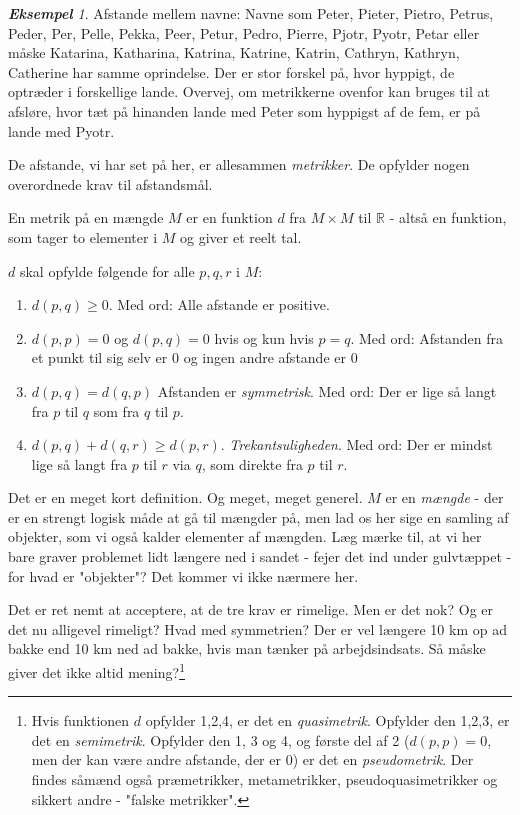 \documentclass[a4paper, 12pt]{article}
\theoremstyle{remark}
\newtheorem{Eksempel}{\textbf{Eksempel}}
\begin{document}
\begin{Eksempel}
Afstande mellem navne: Navne som Peter, Pieter, Pietro, Petrus, Peder, Per, Pelle, Pekka, Peer, Petur, Pedro, Pierre, Pjotr, Pyotr, Petar eller måske Katarina, Katharina, Katrina, Katrine, Katrin, Cathryn, Kathryn, Catherine har samme oprindelse. Der er stor forskel på, hvor hyppigt, de optræder i forskellige lande. Overvej, om metrikkerne ovenfor kan bruges til at afsløre, hvor tæt på hinanden lande med Peter som hyppigst af de fem, er på lande med Pyotr. 


\end{Eksempel}
De afstande, vi har set på her, er allesammen \emph{metrikker}. De opfylder nogen overordnede krav til afstandsmål. 
\begin{tcolorbox}[title=Metrik]
En metrik på en mængde $M$ er en funktion $d$ fra $M\times M$  til $\mathbb{R}$ - altså en funktion, som tager to elementer  i $M$ og giver et reelt tal.

$d$ skal opfylde følgende for alle $p,q,r$ i $M$:
\begin{enumerate}
\item $d(p,q)\geq 0$. Med ord: Alle afstande er positive.
\item $d(p,p)=0$ og $d(p,q)=0$ hvis og kun hvis $p=q$.  Med ord: Afstanden fra et punkt til sig selv er $0$ og ingen andre afstande er $0$
\item $d(p,q)=d(q,p)$ Afstanden er \emph{symmetrisk}. Med ord: Der er lige så langt fra $p$ til $q$ som fra $q$ til $p$.
\item $d(p,q)+d(q,r)\geq d(p,r)$. \emph{Trekantsuligheden}. Med ord:  Der er mindst lige så langt fra $p$ til $ r$ via $q$, som direkte fra $p$ til $r$. 
\end{enumerate}
\end{tcolorbox}

Det er en meget kort definition. Og meget, meget generel. $M$ er en \emph{mængde} - der er en strengt logisk måde at gå til mængder på, men lad os her sige en samling af objekter, som vi også kalder elementer af mængden. Læg mærke til, at vi her bare graver problemet lidt længere ned i sandet - fejer det ind under gulvtæppet - for hvad er "objekter"?  Det kommer vi ikke nærmere her. 

Det er ret nemt at acceptere, at de tre krav er rimelige. Men er det nok? Og er det nu alligevel rimeligt? Hvad med symmetrien? Der er vel længere 10 km op ad bakke end 10 km ned ad bakke, hvis man tænker på arbejdsindsats. Så måske giver det ikke altid mening?\footnote{ Hvis funktionen $d$ opfylder 1,2,4, er det en \emph{quasimetrik}. Opfylder den 1,2,3, er det en \emph{semimetrik}. Opfylder den 1, 3 og 4, og første del af 2 ($d(p,p)=0$, men der kan være andre afstande, der er $0$)  er det en \emph{pseudometrik}.  Der findes såmænd også præmetrikker, metametrikker, pseudoquasimetrikker og sikkert andre - "falske metrikker". }
\end{document}
